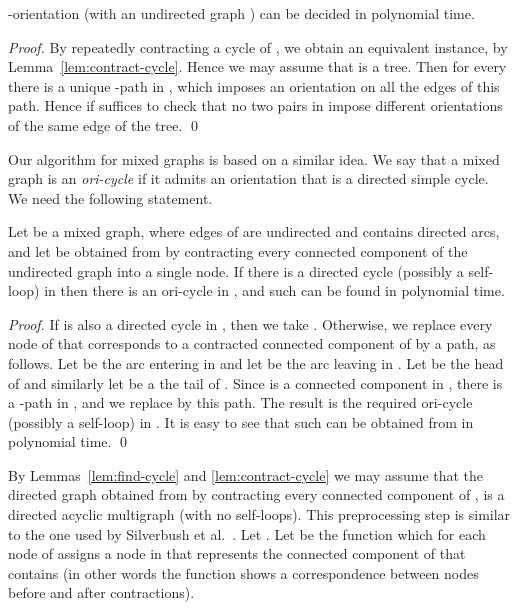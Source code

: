 \documentclass[envcountsame]{llncs}
\begin{document}
\begin{corollary} \label{cor:tree}
{\sf -orientation} (with an undirected graph ) can be decided in polynomial time.
\end{corollary}

\begin{proof}
By repeatedly contracting a cycle of , we obtain an equivalent instance,
by Lemma~\ref{lem:contract-cycle}.
Hence we may assume that  is a tree.
Then for every  there is a unique -path in , 
which imposes an orientation on all the edges of this path.
Hence if suffices to check that no two pairs in  
impose different orientations of the same edge of the tree.
\qed
\end{proof}

Our algorithm for mixed graphs is based on a similar idea.
We say that a mixed graph is an {\em ori-cycle} if it admits an orientation that is a 
directed simple cycle. We need the following statement.

\begin{lemma} \label{lem:find-cycle}
Let  be a mixed graph, where edges of  are undirected and  contains directed arcs, and let  be obtained from  by contracting every
connected component of the undirected graph  into a single node.
If there is a directed cycle (possibly  a self-loop)  in  then there is an ori-cycle  in ,
and such  can be found in polynomial time.
\end{lemma}
\begin{proof}
If  is also a directed cycle in , then we take .
Otherwise, we replace every node  of  that corresponds to a contracted connected component  of 
by a path, as follows.
Let  be the arc entering  in  and let  be the arc leaving  in .
Let  be the head of  and similarly let  be a the tail of .
Since  is a connected component in , there is a -path in , and we replace  by 
this path. The result is the required ori-cycle  (possibly a self-loop) in .
It is easy to see that such  can be obtained from  in polynomial time. 
\qed
\end{proof}

By Lemmas~\ref{lem:find-cycle} and \ref{lem:contract-cycle}
we may assume that the directed graph  obtained from  by contracting every
connected component of , is a directed acyclic multigraph (with no self-loops).
This preprocessing step is similar to the one used by Silverbush et al.~\cite{silverbush}.
Let . Let  be the function
which for each node  of  assigns a node  in 
that represents the connected component of  that contains 
(in other words the function  shows a correspondence between
nodes before and after contractions).
\end{document}
